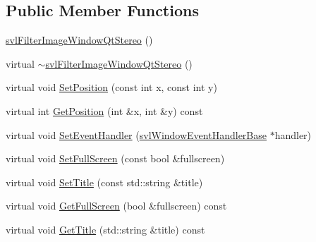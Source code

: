 \subsection*{Public Member Functions}
\begin{DoxyCompactItemize}
\item 
\hyperlink{classsvl_filter_image_window_qt_stereo_a1c3219fea5832e341ea8c7123519ed93}{svl\+Filter\+Image\+Window\+Qt\+Stereo} ()
\item 
virtual \hyperlink{classsvl_filter_image_window_qt_stereo_a54e636cbe5543397079145de1431325f}{$\sim$svl\+Filter\+Image\+Window\+Qt\+Stereo} ()
\item 
virtual void \hyperlink{classsvl_filter_image_window_qt_stereo_af57d36ad53070804c92b3162502766a2}{Set\+Position} (const int x, const int y)
\item 
virtual int \hyperlink{classsvl_filter_image_window_qt_stereo_a306952a3c4c361f9778a97a93cf2963a}{Get\+Position} (int \&x, int \&y) const 
\item 
virtual void \hyperlink{classsvl_filter_image_window_qt_stereo_a0439c539d1eb7e4e59e19e929d6c93be}{Set\+Event\+Handler} (\hyperlink{classsvl_window_event_handler_base}{svl\+Window\+Event\+Handler\+Base} $\ast$handler)
\item 
virtual void \hyperlink{classsvl_filter_image_window_qt_stereo_a6b072cbc8b4ebfdc6788eaf053d2ba07}{Set\+Full\+Screen} (const bool \&fullscreen)
\item 
virtual void \hyperlink{classsvl_filter_image_window_qt_stereo_af370ca31f19b615b509ede8240489542}{Set\+Title} (const std\+::string \&title)
\item 
virtual void \hyperlink{classsvl_filter_image_window_qt_stereo_a34703c38e840d5f206098c89f55ab4b9}{Get\+Full\+Screen} (bool \&fullscreen) const 
\item 
virtual void \hyperlink{classsvl_filter_image_window_qt_stereo_ac2f05d762302e4bf94d3d9897aa6d8c5}{Get\+Title} (std\+::string \&title) const 
\end{DoxyCompactItemize}
